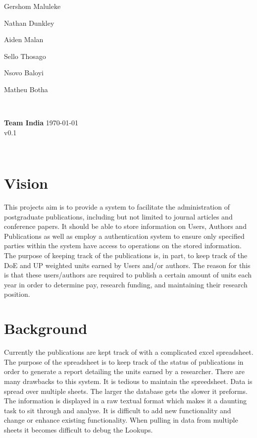 \documentclass{article}
\begin{document}
\begin{titlepage}
\begin{minipage}{0.4\textwidth}
\begin{flushleft}
	Gershom Maluleke

	Nathan Dunkley

	Aiden Malan

	Sello Thosago

	Nsovo Baloyi

	Matheu Botha 
	\end{flushleft}
	\end{minipage}
	~
	\begin{minipage}{0.4\textwidth}
	\begin{flushright} \large
	{ \huge \bfseries Team India }%
	{\large \today}\\
	{\large v0.1}
	\end{flushright}
	\end{minipage}\\[4cm]
\end{titlepage}


	\newpage

	\section{Vision}

	This projects aim is to provide a system to facilitate the administration of postgraduate publications, including but not limited to journal articles and conference papers. It should be able to store information on Users, Authors and Publications as well as employ a authentication system to ensure only specified parties within the system have access to operations on the stored information.
	The purpose of keeping track of the publications is, in part, to keep track of the DoE and UP weighted units earned by Users and/or authors. The reason for this is that these users/authors are required to publish a certain amount of units each year in order to determine pay, research funding, and maintaining their research position.

	\section{Background}
	Currently the publications are kept track of with a complicated excel spreadsheet. The purpose of the spreadsheet is to keep track of the status of publications in order to generate a report detailing the units earned by a researcher. There are many drawbacks to this system. It is tedious to maintain the spreedsheet. Data is spread over multiple sheets. The larger the database gets the slower it preforms. The information is displayed in a raw textual format which makes it a daunting task to sit through and analyse. It is difficult to add new functionality and change or enhance existing functionality. When pulling in data from multiple sheets it becomes difficult to debug the Lookups.
\end{document}
